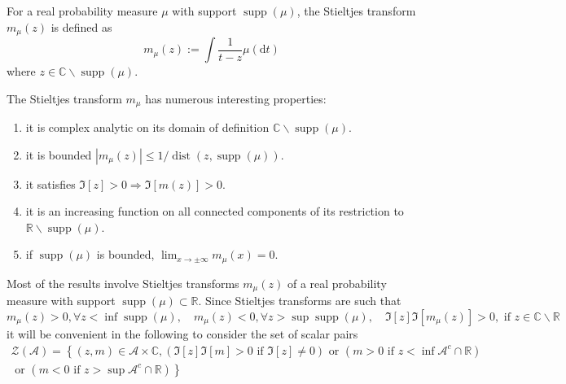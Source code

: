 \begin{definition}
    For a real probability measure $\mu$ with support $\operatorname{supp}(\mu)$, the Stieltjes transform $m_{\mu}(z)$ is defined as
    \begin{equation}
        m_{\mu}(z):=\int\frac{1}{t-z}\mu\left(\mathrm{d}t\right)
    \end{equation}
    where $z\in\mathbb{C}\backslash\operatorname{supp}(\mu)$.
\end{definition}

\begin{property}
    The Stieltjes transform $m_{\mu}$ has numerous interesting properties:
    \begin{enumerate}
        \item it is complex analytic on its domain of definition $\mathbb{C} \backslash \operatorname{supp}(\mu)$.
        \item it is bounded $\left|m_{\mu}(z)\right|\leq 1/\operatorname{dist}(z,\operatorname{supp}(\mu))$.
        \item it satisfies $\Im[z]>0 \Rightarrow \Im[m(z)]>0$.
        \item it is an increasing function on all connected components of its restriction to $\mathbb{R}\backslash\operatorname{supp}(\mu)$. %
        \item if $\operatorname{supp}(\mu)$ is bounded, $\lim_{x\rightarrow\pm\infty}m_{\mu}(x)=0$.
    \end{enumerate}
\end{property}

\begin{remark}
    Most of the results involve Stieltjes transforms $m_{\mu}(z)$ of a real probability measure with support $\operatorname{supp}(\mu) \subset \mathbb{R} .$ Since Stieltjes transforms are such that
    \begin{equation*}
        m_{\mu}(z)>0,\forall z<\inf\operatorname{supp}(\mu),\quad m_{\mu}(z)<0,\forall z>\sup \operatorname{supp}(\mu),\quad\Im[z] \Im\left[m_{\mu}(z)\right]>0,\text{ if }z\in\mathbb{C}\backslash\mathbb{R}
    \end{equation*}
    it will be convenient in the following to consider the set of scalar pairs
    \begin{equation*}
        \begin{array}{c}
            \mathcal{Z}(\mathcal{A})=\left\{(z,m)\in\mathcal{A}\times\mathbb{C},(\Im[z]\Im[m]>0\text{ if } \Im[z] \neq 0)\text{ or }\left(m>0\text{ if }z<\inf \mathcal{A}^{c} \cap \mathbb{R}\right)\right. \\
            \left.\text{ or }\left(m<0\text{ if }z>\sup \mathcal{A}^{c} \cap \mathbb{R}\right)\right\}
        \end{array}
    \end{equation*}
\end{remark}

